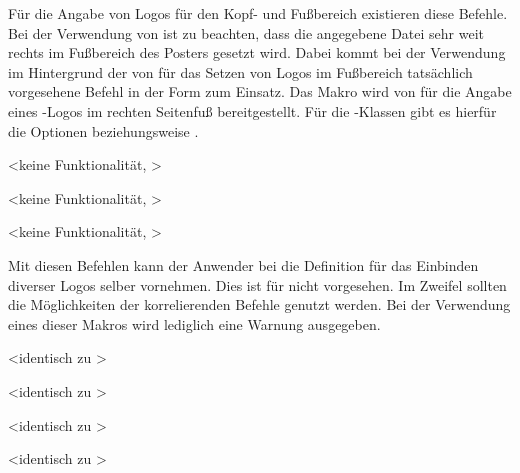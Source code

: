 \begin{DeclareEntity}{}
\begin{Declaration}
\begin{Declaration}
\begin{Declaration}
Für die Angabe von Logos für den Kopf- und Fußbereich existieren diese Befehle. 
Bei der Verwendung von  ist zu 
beachten, dass die angegebene Datei sehr weit rechts im Fußbereich des Posters 
gesetzt wird. Dabei kommt bei der Verwendung im Hintergrund der von \TUDScript 
für das Setzen von Logos im Fußbereich tatsächlich vorgesehene Befehl in der 
Form 
zum Einsatz. Das Makro  wird von  für 
die Angabe eines \DDC-Logos im rechten Seitenfuß bereitgestellt. Für die 
\TUDScript-Klassen gibt es hierfür die Optionen  beziehungsweise 
.
\end{Declaration}
\end{Declaration}
\end{Declaration}

\begin{Declaration}
  {}
  <keine Funktionalität, >
\begin{Declaration}
  {}
  <keine Funktionalität, >
\begin{Declaration}
  {}
  <keine Funktionalität, >
\printdeclarationlist

Mit diesen Befehlen kann der Anwender bei  die Definition 
für das Einbinden diverser Logos selber vornehmen. Dies ist für \TUDScript 
nicht vorgesehen. Im Zweifel sollten die Möglichkeiten der korrelierenden 
Befehle genutzt werden. Bei der Verwendung eines dieser Makros wird lediglich 
eine Warnung ausgegeben.
\end{Declaration}
\end{Declaration}
\end{Declaration}

\begin{Declaration}
  {}
  <identisch zu >
\begin{Declaration}
  {}
  <identisch zu >
\begin{Declaration}
  {}
  <identisch zu >
\begin{Declaration}
  {}
  <identisch zu >
\printdeclarationlist


\end{Declaration}
\end{Declaration}
\end{Declaration}
\end{Declaration}
\end{DeclareEntity}
